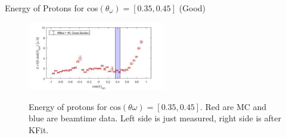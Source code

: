 \documentclass[
		10pt
		]{beamer}
\begin{document}
\begin{frame}{Energy of Protons for cos$(\theta_{\omega})=[0.35,0.45]$ (Good)}
	
	\begin{figure}
		\hspace{0cm}  \vspace{-1cm}
		\includegraphics[width=6cm]{Plots/9}
	\end{figure}
	
	\begin{figure}%
		\centering
		\qquad
		\captionsetup{labelformat=empty}
		\caption{Energy of protons for $\textrm{cos}(\theta{\omega}) = [0.35, 0.45] $. Red are MC and blue are beamtime data. Left side is just measured, right side is after KFit. }%
		\label{fig:example}%
	\end{figure}
	
\end{frame}
\end{document}
